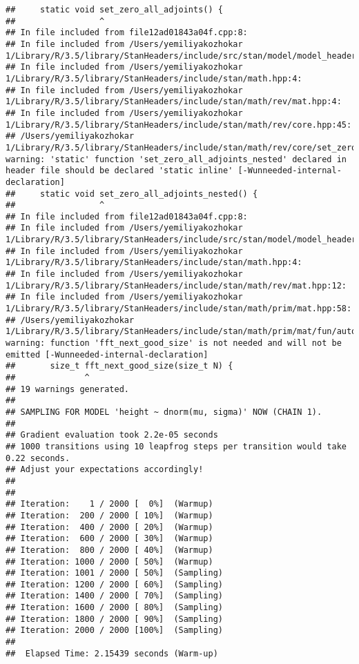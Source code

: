 \documentclass[]{article}
\begin{document}
\begin{verbatim}
##     static void set_zero_all_adjoints() {
##                 ^
## In file included from file12ad01843a04f.cpp:8:
## In file included from /Users/yemiliyakozhokar 1/Library/R/3.5/library/StanHeaders/include/src/stan/model/model_header.hpp:4:
## In file included from /Users/yemiliyakozhokar 1/Library/R/3.5/library/StanHeaders/include/stan/math.hpp:4:
## In file included from /Users/yemiliyakozhokar 1/Library/R/3.5/library/StanHeaders/include/stan/math/rev/mat.hpp:4:
## In file included from /Users/yemiliyakozhokar 1/Library/R/3.5/library/StanHeaders/include/stan/math/rev/core.hpp:45:
## /Users/yemiliyakozhokar 1/Library/R/3.5/library/StanHeaders/include/stan/math/rev/core/set_zero_all_adjoints_nested.hpp:17:17: warning: 'static' function 'set_zero_all_adjoints_nested' declared in header file should be declared 'static inline' [-Wunneeded-internal-declaration]
##     static void set_zero_all_adjoints_nested() {
##                 ^
## In file included from file12ad01843a04f.cpp:8:
## In file included from /Users/yemiliyakozhokar 1/Library/R/3.5/library/StanHeaders/include/src/stan/model/model_header.hpp:4:
## In file included from /Users/yemiliyakozhokar 1/Library/R/3.5/library/StanHeaders/include/stan/math.hpp:4:
## In file included from /Users/yemiliyakozhokar 1/Library/R/3.5/library/StanHeaders/include/stan/math/rev/mat.hpp:12:
## In file included from /Users/yemiliyakozhokar 1/Library/R/3.5/library/StanHeaders/include/stan/math/prim/mat.hpp:58:
## /Users/yemiliyakozhokar 1/Library/R/3.5/library/StanHeaders/include/stan/math/prim/mat/fun/autocorrelation.hpp:17:14: warning: function 'fft_next_good_size' is not needed and will not be emitted [-Wunneeded-internal-declaration]
##       size_t fft_next_good_size(size_t N) {
##              ^
## 19 warnings generated.
## 
## SAMPLING FOR MODEL 'height ~ dnorm(mu, sigma)' NOW (CHAIN 1).
## 
## Gradient evaluation took 2.2e-05 seconds
## 1000 transitions using 10 leapfrog steps per transition would take 0.22 seconds.
## Adjust your expectations accordingly!
## 
## 
## Iteration:    1 / 2000 [  0%]  (Warmup)
## Iteration:  200 / 2000 [ 10%]  (Warmup)
## Iteration:  400 / 2000 [ 20%]  (Warmup)
## Iteration:  600 / 2000 [ 30%]  (Warmup)
## Iteration:  800 / 2000 [ 40%]  (Warmup)
## Iteration: 1000 / 2000 [ 50%]  (Warmup)
## Iteration: 1001 / 2000 [ 50%]  (Sampling)
## Iteration: 1200 / 2000 [ 60%]  (Sampling)
## Iteration: 1400 / 2000 [ 70%]  (Sampling)
## Iteration: 1600 / 2000 [ 80%]  (Sampling)
## Iteration: 1800 / 2000 [ 90%]  (Sampling)
## Iteration: 2000 / 2000 [100%]  (Sampling)
## 
##  Elapsed Time: 2.15439 seconds (Warm-up)

\end{verbatim}
\end{document}
